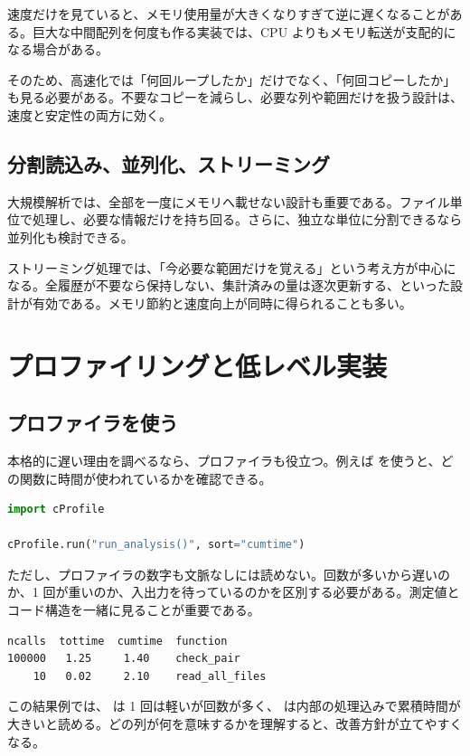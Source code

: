 速度だけを見ていると、メモリ使用量が大きくなりすぎて逆に遅くなることがある。巨大な中間配列を何度も作る実装では、CPU よりもメモリ転送が支配的になる場合がある。

そのため、高速化では「何回ループしたか」だけでなく、「何回コピーしたか」も見る必要がある。不要なコピーを減らし、必要な列や範囲だけを扱う設計は、速度と安定性の両方に効く。

\subsection{分割読込み、並列化、ストリーミング}

大規模解析では、全部を一度にメモリへ載せない設計も重要である。ファイル単位で処理し、必要な情報だけを持ち回る。さらに、独立な単位に分割できるなら並列化も検討できる。

ストリーミング処理では、「今必要な範囲だけを覚える」という考え方が中心になる。全履歴が不要なら保持しない、集計済みの量は逐次更新する、といった設計が有効である。メモリ節約と速度向上が同時に得られることも多い。

\section{プロファイリングと低レベル実装}

\subsection{プロファイラを使う}

本格的に遅い理由を調べるなら、プロファイラも役立つ。例えば  を使うと、どの関数に時間が使われているかを確認できる。

\begin{lstlisting}[language=Python]
import cProfile

cProfile.run("run_analysis()", sort="cumtime")
\end{lstlisting}

ただし、プロファイラの数字も文脈なしには読めない。回数が多いから遅いのか、1 回が重いのか、入出力を待っているのかを区別する必要がある。測定値とコード構造を一緒に見ることが重要である。

\begin{lstlisting}[numbers=none, xleftmargin=2\zw]
ncalls  tottime  cumtime  function
100000   1.25     1.40    check_pair
    10   0.02     2.10    read_all_files
\end{lstlisting}

この結果例では、 は 1 回は軽いが回数が多く、 は内部の処理込みで累積時間が大きいと読める。どの列が何を意味するかを理解すると、改善方針が立てやすくなる。

